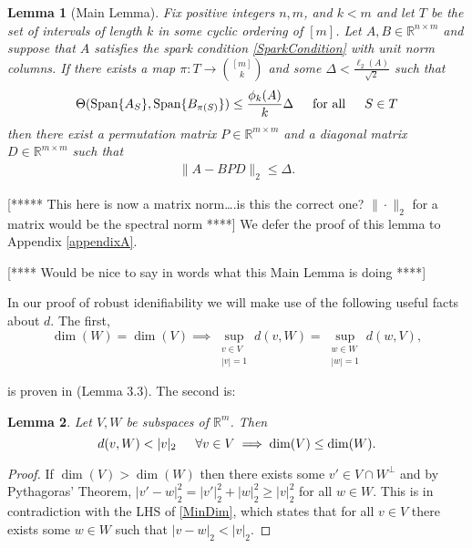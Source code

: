 \documentclass[journal, onecolumn]{IEEEtran}
\newtheorem{lemma}{Lemma}
\begin{document}
\begin{lemma}[Main Lemma]\label{MainLemma}
Fix positive integers $n, m$, and $k < m$ and let $T$ be the set of intervals of length $k$ in some cyclic ordering of $[m]$. Let $A, B \in \mathbb{R}^{n \times m}$ and suppose that $A$ satisfies the spark condition \eqref{SparkCondition} with unit norm columns.  If there exists a map $\pi: T \to {[m] \choose k}$ and some $\Delta < \frac{\ell_{2}(A)}{\sqrt{2}}$ such that 
\begin{equation}\label{GapUpperBound}
\Theta(\text{Span}\{A_{S}\}, \text{Span}\{B_{\pi(S)}\}) \leq \frac{ \phi_k(A) }{k} \Delta \indent \text{for all} \indent S \in T
\end{equation}
%
then there exist a permutation matrix $P \in \mathbb{R}^{m \times m}$ and a diagonal matrix $D \in \mathbb{R}^{m \times m}$ such that
\begin{align}
\|A - BPD\|_2 \leq \Delta.
\end{align}
\end{lemma}
[***** This here is now a matrix norm\ldots.is this the correct one?  $\|\cdot \|_2$ for a matrix would be the spectral norm ****]
We defer the proof of this lemma to Appendix \ref{appendixA}. 

[**** Would be nice to say in words what this Main Lemma is doing ****]

In our proof of robust idenifiability we will make use of the following useful facts about $d$. The first, 
\begin{equation}\label{SubspaceMetricSameDim}
\dim(W) = \dim(V) \implies \sup_{\substack{v \in V \\ |v| = 1}}  d(v,W)  = \sup_{\substack{w \in W \\ |w| = 1}} d(w,V),
\end{equation}

is proven in \cite{Morris10} (Lemma 3.3). The second is:
\begin{lemma}\label{MinDimLemma}
Let $V, W$ be subspaces of $\mathbb{R}^{m}$. Then
\begin{equation}\label{MinDim}
d(v,W) < |v|_2 \indent \forall v \in V \implies \dim(V) \leq \dim(W).
\end{equation}
\end{lemma}

\begin{proof}
If $\dim(V) > \dim(W)$ then there exists some $v' \in V \cap W^\perp$ and by Pythagoras' Theorem, $|v' - w|_2^2 = |v'|_2^2 + |w|_2^2 \geq |v|_2^2$ for all $w \in W$. This is in contradiction with the LHS of \eqref{MinDim}, which states that for all $v \in V$ there exists some $w \in W$ such that $|v - w|_2 < |v|_2$.
\end{proof}
\end{document}
